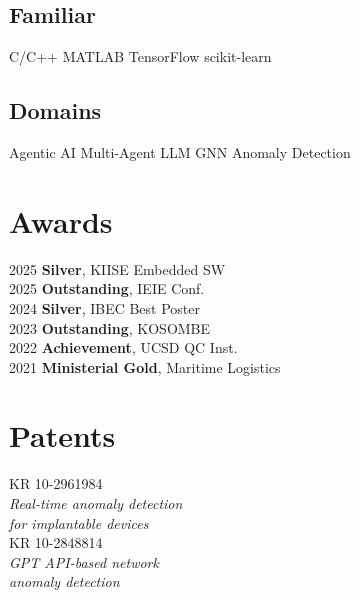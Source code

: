 \documentclass[]{deedy-resume-openfont}
\begin{document}
\begin{minipage}[t]{0.33\textwidth}
\subsection{Familiar}
C/C++ \textbullet{} MATLAB \textbullet{} TensorFlow \textbullet{} scikit-learn
\sectionsep

\subsection{Domains}
Agentic AI \textbullet{} Multi-Agent LLM \textbullet{} GNN \textbullet{} Anomaly Detection
\sectionsep

\section{Awards}
2025 \textbar{} \textbf{Silver}, KIISE Embedded SW \\
2025 \textbar{} \textbf{Outstanding}, IEIE Conf. \\
2024 \textbar{} \textbf{Silver}, IBEC Best Poster \\
2023 \textbar{} \textbf{Outstanding}, KOSOMBE \\
2022 \textbar{} \textbf{Achievement}, UCSD QC Inst. \\
2021 \textbar{} \textbf{Ministerial Gold}, Maritime Logistics

\sectionsep

\section{Patents}
KR 10-2961984 \\
\textit{Real-time anomaly detection \\ for implantable devices} \\[0.3em]
KR 10-2848814 \\
\textit{GPT API-based network \\ anomaly detection}

\end{minipage}
\hfill
\end{document}

